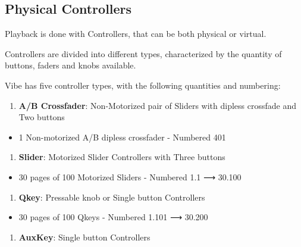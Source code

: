 \documentclass[
]{article}
\providecommand{\tightlist}{%
  \setlength{\itemsep}{0pt}\setlength{\parskip}{0pt}}
\begin{document}
\hypertarget{Physical-Controllers-11.1}{%
\subsection{Physical Controllers}\label{Physical-Controllers-11.1}}

Playback is done with Controllers, that can be both physical or virtual.

Controllers are divided into different types, characterized by the quantity of buttons, faders and knobs available.

Vibe has five controller types, with the following quantities and numbering:

\begin{enumerate}
\def\labelenumi{\arabic{enumi}.}
\tightlist
\item
  \textbf{A/B Crossfader}: Non-Motorized pair of Sliders with dipless crossfade and Two buttons
\end{enumerate}

\begin{itemize}
\tightlist
\item
  1 Non-motorized A/B dipless crossfader - Numbered 401
\end{itemize}

\begin{enumerate}
\def\labelenumi{\arabic{enumi}.}
\setcounter{enumi}{1}
\tightlist
\item
  \textbf{Slider}: Motorized Slider Controllers with Three buttons
\end{enumerate}

\begin{itemize}
\tightlist
\item
  30 pages of 100 Motorized Sliders - Numbered 1.1 ⟶ 30.100
\end{itemize}

\begin{enumerate}
\def\labelenumi{\arabic{enumi}.}
\setcounter{enumi}{2}
\tightlist
\item
  \textbf{Qkey}: Pressable knob or Single button Controllers
\end{enumerate}

\begin{itemize}
\tightlist
\item
  30 pages of 100 Qkeys - Numbered 1.101 ⟶ 30.200
\end{itemize}

\begin{enumerate}
\def\labelenumi{\arabic{enumi}.}
\setcounter{enumi}{3}
\tightlist
\item
  \textbf{AuxKey}: Single button Controllers
\end{enumerate}
\end{document}
